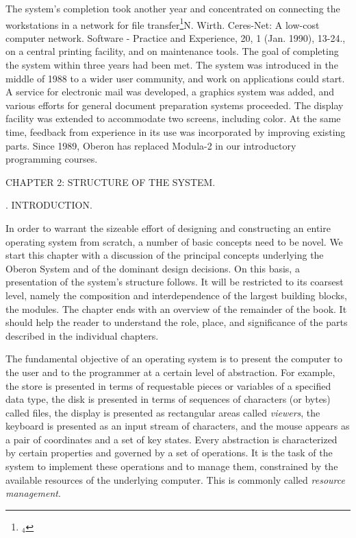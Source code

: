 The system's completion took another year and concentrated on
connecting the workstations in a network for file transfer\footnote{$_4$}{N. Wirth. Ceres-Net: A low-cost computer network. Software - Practice and Experience, 20, 1 (Jan. 1990), 13-24.}, on a
central printing facility, and on maintenance tools. The goal of
completing the system within three years had been met. The system was
introduced in the middle of 1988 to a wider user community, and work
on applications could start. A service for electronic mail was
developed, a graphics system was added, and various efforts for
general document preparation systems proceeded. The display facility
was extended to accommodate two screens, including color. At the same
time, feedback from experience in its use was incorporated by
improving existing parts. Since 1989, Oberon has replaced Modula-2 in
our introductory programming courses.

\beginchapter CHAPTER 2: STRUCTURE OF THE SYSTEM.

\medskip

. INTRODUCTION.

In order to warrant the sizeable effort of designing and constructing
an entire operating system from scratch, a number of basic concepts
need to be novel. %
We start this chapter with a discussion of the
principal concepts underlying the Oberon System and of the dominant
design decisions. On this basis, a presentation of the system's
structure follows. It will be restricted to its coarsest level, namely
the composition and interdependence of the largest building blocks,
the modules. The chapter ends with an overview of the remainder of the
book. It should help the reader to understand the role, place, and
significance of the parts described in the individual chapters.

The fundamental objective of an operating system is to present the
computer to the user and to the programmer at a certain level of
abstraction. For example, the store is presented in terms of
requestable pieces or variables of a specified data type, the disk is
presented in terms of sequences of characters (or bytes) called files,
the display is presented as rectangular areas called \emph{viewers}, the
keyboard is presented as an input stream of characters, and the mouse
appears as a pair of coordinates and a set of key states. Every
abstraction is characterized by certain properties and governed by a
set of operations. It is the task of the system to implement these
operations and to manage them, constrained by the available resources
of the underlying computer. This is commonly called \emph{resource management}.

